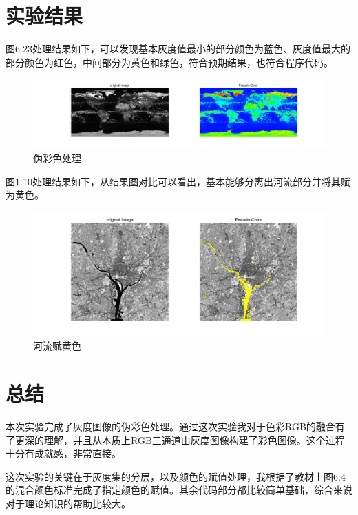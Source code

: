 \documentclass[12pt]{article}
\begin{document}
\section{实验结果}
图6.23处理结果如下，可以发现基本灰度值最小的部分颜色为蓝色、灰度值最大的部分颜色为红色，中间部分为黄色和绿色，符合预期结果，也符合程序代码。
\begin{figure}[H]
	\centering
	\includegraphics[width=1\linewidth]{figures/2}
	\caption{伪彩色处理}
\end{figure}

图1.10处理结果如下，从结果图对比可以看出，基本能够分离出河流部分并将其赋为黄色。
\begin{figure}[H]
	\centering
	\includegraphics[width=0.8\linewidth]{figures/3}
	\caption{河流赋黄色}
\end{figure}
\section{总结}
本次实验完成了灰度图像的伪彩色处理。通过这次实验我对于色彩RGB的融合有了更深的理解，并且从本质上RGB三通道由灰度图像构建了彩色图像。这个过程十分有成就感，非常直接。

这次实验的关键在于灰度集的分层，以及颜色的赋值处理，我根据了教材上图6.4的混合颜色标准完成了指定颜色的赋值。其余代码部分都比较简单基础，综合来说对于理论知识的帮助比较大。
\end{document}

